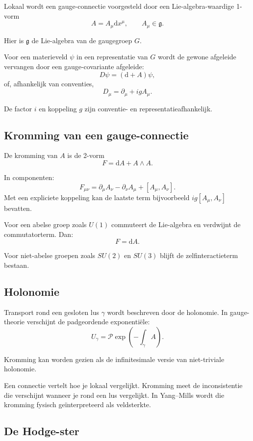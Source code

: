\documentclass[11pt,a4paper]{article}
\newcommand{\dd}{\mathrm{d}}
\newcommand{\Lie}{\mathfrak{g}}
\begin{document}
Lokaal wordt een gauge-connectie voorgesteld door een Lie-algebra-waardige 1-vorm
\[
A=A_\mu\dd x^\mu,
\qquad A_\mu\in\Lie.
\]

Hier is $\Lie$ de Lie-algebra van de gaugegroep $G$.

Voor een materieveld $\psi$ in een representatie van $G$ wordt de gewone afgeleide vervangen door een gauge-covariante afgeleide:
\[
D\psi=(\dd+A)\psi,
\]
of, afhankelijk van conventies,
\[
D_\mu=\partial_\mu+igA_\mu.
\]

De factor $i$ en koppeling $g$ zijn conventie- en representatieafhankelijk.

\subsection{Kromming van een gauge-connectie}

De kromming van $A$ is de 2-vorm
\[
\boxed{F=\dd A+A\wedge A.}
\]

In componenten:
\[
F_{\mu\nu}
=\partial_\mu A_\nu-\partial_\nu A_\mu+[A_\mu,A_\nu].
\]
Met een expliciete koppeling kan de laatste term bijvoorbeeld $ig[A_\mu,A_\nu]$ bevatten.

Voor een abelse groep zoals $U(1)$ commuteert de Lie-algebra en verdwijnt de commutatorterm. Dan:
\[
F=\dd A.
\]

Voor niet-abelse groepen zoals $SU(2)$ en $SU(3)$ blijft de zelfinteractieterm bestaan.

\subsection{Holonomie}

Transport rond een gesloten lus $\gamma$ wordt beschreven door de holonomie. In gauge-theorie verschijnt de padgeordende exponentiële:
\[
U_\gamma=\mathcal{P}\exp\left(-\int_\gamma A\right).
\]

Kromming kan worden gezien als de infinitesimale versie van niet-triviale holonomie.

\begin{kernidee}
Een connectie vertelt hoe je lokaal vergelijkt. Kromming meet de inconsistentie die verschijnt wanneer je rond een lus vergelijkt. In Yang--Mills wordt die kromming fysisch geïnterpreteerd als veldsterkte.
\end{kernidee}

\subsection{De Hodge-ster}
\end{document}
